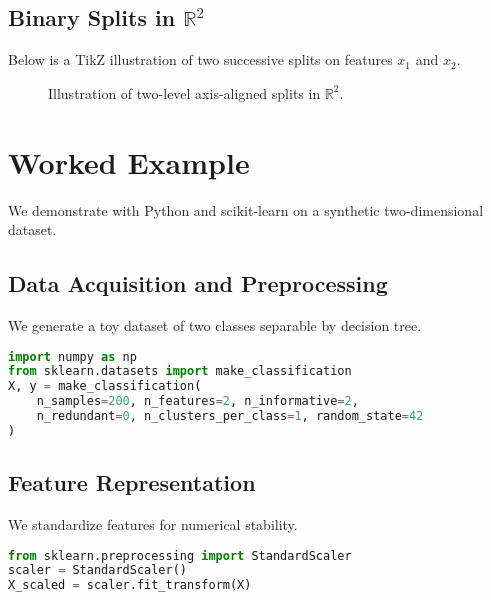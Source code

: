 \documentclass[11pt]{article}
\begin{document}
\subsection{Binary Splits in $\mathbb{R}^2$}
Below is a TikZ illustration of two successive splits on features $x_1$ and $x_2$.  

\begin{center}
\begin{figure}[h]
\caption{Illustration of two-level axis-aligned splits in $\mathbb{R}^2$.}
\end{figure}
\end{center}

\section{Worked Example}
We demonstrate with Python and scikit-learn on a synthetic two-dimensional dataset.

\subsection{Data Acquisition and Preprocessing}
We generate a toy dataset of two classes separable by decision tree.
\begin{lstlisting}[language=Python]
import numpy as np
from sklearn.datasets import make_classification
X, y = make_classification(
    n_samples=200, n_features=2, n_informative=2,
    n_redundant=0, n_clusters_per_class=1, random_state=42
)
\end{lstlisting}

\subsection{Feature Representation}
We standardize features for numerical stability.
\begin{lstlisting}[language=Python]
from sklearn.preprocessing import StandardScaler
scaler = StandardScaler()
X_scaled = scaler.fit_transform(X)
\end{lstlisting}
\end{document}
